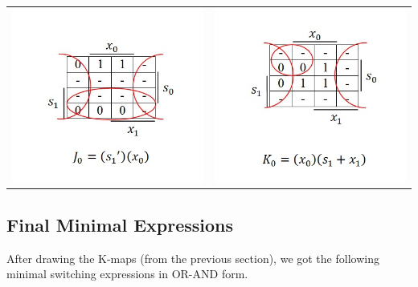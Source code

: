 \documentclass{article}
\begin{document}
\begin{table}[h!]
\begin{tabular}{ c c }
\centering
\includegraphics[scale=0.6]{J0-KMap} &
\includegraphics[scale=0.6]{K0-KMap} \\
\end{tabular}
\end{table}

\pagebreak


\subsection{Final Minimal Expressions}
After drawing the K-maps (from the previous section), we got the following 
minimal switching expressions in OR-AND form.\\
\end{document}

